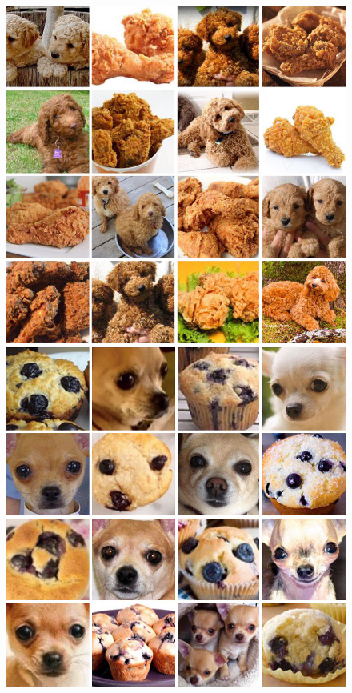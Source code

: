 \documentclass[a4paper, oneside]{discothesis}
\begin{document}
\begin{figure}[th]
	\hfill
	\begin{minipage}[t]{0.24\textwidth}\centering\includegraphics[width=\textwidth]{figures/dog-vs-chicken.jpeg}\end{minipage}
	\hfill
	\begin{minipage}[t]{0.24\textwidth}\centering\includegraphics[width=\textwidth]{figures/dog-vs-muffin.jpeg}\end{minipage}
	

\end{figure}
\end{document}
